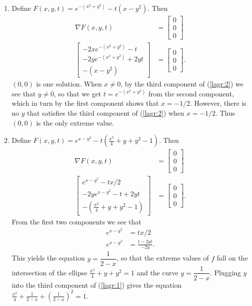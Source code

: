 \begin{enumerate}
 \item
  Define $F(x,y,t) = e^{-(x^2+y^2)} - t(x - y^2)$.  Then
  \begin{align}
   \nabla F(x,y,t) &= \begin{bmatrix} 0 \\ 0 \\ 0 \end{bmatrix} \nonumber \\
   \begin{bmatrix}
    -2xe^{-(x^2+y^2)} - t \\
    -2ye^{-(x^2+y^2)} + 2yt \\
    -(x - y^2)
   \end{bmatrix} &= \begin{bmatrix} 0 \\ 0 \\ 0 \end{bmatrix}. \label{lagr:2}
  \end{align}
  $(0,0)$ is one solution.  When $x \neq 0$, by the third component of
  (\ref{lagr:2}) we see that $y \neq 0$, so that we get $t = e^{-(x^2+y^2)}$
  from the second component, which in turn by the first component shows
  that $x = -1/2$.  However, there is no $y$ that satisfies the third
  component of (\ref{lagr:2}) when $x = -1/2$.  Thus $(0, 0)$ is the only
  extreme value.

 \item
  Define $F(x,y,t) = e^{x-y^2} - t(\frac{x^2}{4}+y+y^2 - 1)$.  Then
  \begin{align}
   \nabla F(x,y,t) &= \begin{bmatrix} 0 \\ 0 \\ 0 \end{bmatrix} \nonumber \\
   \begin{bmatrix}
    e^{x-y^2} - tx/2 \\
    -2ye^{x-y^2} - t + 2yt \\
    -(\frac{x^2}{4}+y+y^2 - 1)
   \end{bmatrix} &= \begin{bmatrix} 0 \\ 0 \\ 0 \end{bmatrix}. \label{lagr:1}
  \end{align}
  From the first two components we see that
  \begin{align*}
   e^{x-y^2} &= tx/2 \\
   e^{x - y^2} &= \frac{t-2yt}{-2y}.
  \end{align*}
  This yields the equation $y = \dfrac{1}{2-x}$, so that the extreme values
  of $f$ fall on the intersection of the ellipse $\frac{x^2}{4}+y+y^2 = 1$
  and the curve $y = \dfrac{1}{2-x}$.
  Plugging $y$ into the third component of (\ref{lagr:1}) gives the equation
  $\frac{x^2}{4} + \frac{1}{2-x} + (\frac{1}{2-x})^2 = 1$.

\end{enumerate}

